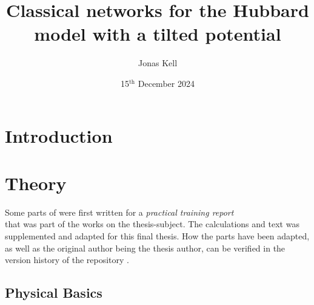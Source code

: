 \documentclass[
headings=optiontohead,              %
12pt,                               %
DIV=13,                             %
twoside=false,                      %
open=right,                         %
BCOR=00mm,                          %
toc=bibliographynumbered            %
]{scrreport}
\title{Classical networks for the Hubbard model with a tilted potential}
\author{Jonas Kell}
\date{15$^\text{th}$ December 2024} %
\begin{document}
\thispagestyle{empty}                           %
\cleardoublepage                                %
\pagestyle{scrheadings}                         %
\renewcommand{\contentsname}{Table of Contents} %
\tableofcontents                                %
\cleardoublepage                                %

\clearpairofpagestyles
\ihead{\leftmark}
\ohead{\Ifstr{\leftmark}{\rightmark}{}{\rightmark}}
\cfoot*{\pagemark}


\chapter{Introduction}
\label{sec:introduction}

\FloatBarrier

\chapter{Theory}
\label{sec:theory}

Some parts of  were first written for a \emph{practical training report}\\  that was part of the works on the thesis-subject.
The calculations and text was supplemented and adapted for this final thesis. 
How the parts have been adapted, as well as the original author being the thesis author, can be verified in the version history of the repository \cite{selfDocument}.

    \section{Physical Basics}
    \label{sec:theory-physics}
    
    \FloatBarrier
\end{document}
